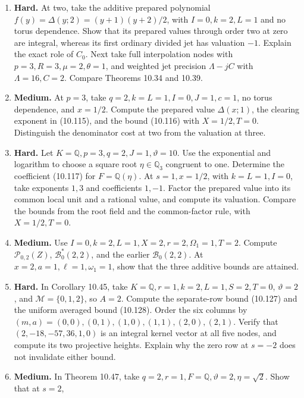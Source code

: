 \documentclass[
  11pt,
  a4paper,
]{article}
\begin{document}
\begin{enumerate}
  \(\gamma,\Gamma\), and the polynomial \(F(Z)\). Check (10.107) for
  \(s=0,j=1\). If a torus factor with slope \(w\) is added, compare the
  sufficient slope hypothesis for \(w=9\) and \(w=3\).
\item
  \textbf{Hard.} At two, take the additive prepared polynomial
  \(f(y)=\Delta(y;2)=(y+1)(y+2)/2\), with \(I=0,k=2,L=1\) and no torus
  dependence. Show that its prepared values through order two at zero
  are integral, whereas its first ordinary divided jet has valuation
  \(-1\). Explain the exact role of \(C_0\). Next take full
  interpolation nodes with \(p=3,R=3,\mu=2,\theta=1\), and weighted jet
  precision \(\Lambda-jC\) with \(\Lambda=16,C=2\). Compare Theorems
  10.34 and 10.39.
\item
  \textbf{Medium.} At \(p=3\), take \(q=2,k=L=1,I=0,J=1,c=1\), no torus
  dependence, and \(x=1/2\). Compute the prepared value \(\Delta(x;1)\),
  the clearing exponent in (10.115), and the bound (10.116) with
  \(X=1/2,T=0\). Distinguish the denominator cost at two from the
  valuation at three.
\item
  \textbf{Hard.} Let \(K=\mathbb Q,p=3,q=2,J=1,\vartheta=10\). Use the
  exponential and logarithm to choose a square root
  \(\eta\in\mathbb Q_3\) congruent to one. Determine the coefficient
  (10.117) for \(F=\mathbb Q(\eta)\). At \(s=1,x=1/2\), with
  \(k=L=1,I=0\), take exponents \(1,3\) and coefficients \(1,-1\).
  Factor the prepared value into its common local unit and a rational
  value, and compute its valuation. Compare the bounds from the root
  field and the common-factor rule, with \(X=1/2,T=0\).
\item
  \textbf{Medium.} Use \(I=0,k=2,L=1,X=2,r=2,\Omega_1=1,T=2\). Compute
  \(\mathcal P_{0,2}(Z)\), \(\mathcal B_0^*(2,2)\), and the earlier
  \(\mathcal B_0(2,2)\). At \(x=2,a=1,\ell=1,\omega_1=1\), show that the
  three additive bounds are attained.
\item
  \textbf{Hard.} In Corollary 10.45, take
  \(K=\mathbb Q,r=1,k=2,L=1,S=2,T=0\), \(\vartheta=2\), and
  \(\mathcal M=\{0,1,2\}\), so \(A=2\). Compute the separate-row bound
  (10.127) and the uniform averaged bound (10.128). Order the six
  columns by \((m,a)=(0,0),(0,1),(1,0),(1,1),(2,0),(2,1)\). Verify that
  \((2,-18,-57,36,1,0)\) is an integral kernel vector at all five nodes,
  and compute its two projective heights. Explain why the zero row at
  \(s=-2\) does not invalidate either bound.
\item
  \textbf{Medium.} In Theorem 10.47, take
  \(q=2,r=1,F=\mathbb Q,\vartheta=2,\eta=\sqrt2\). Show that at \(s=2\),

\end{enumerate}
\end{document}

